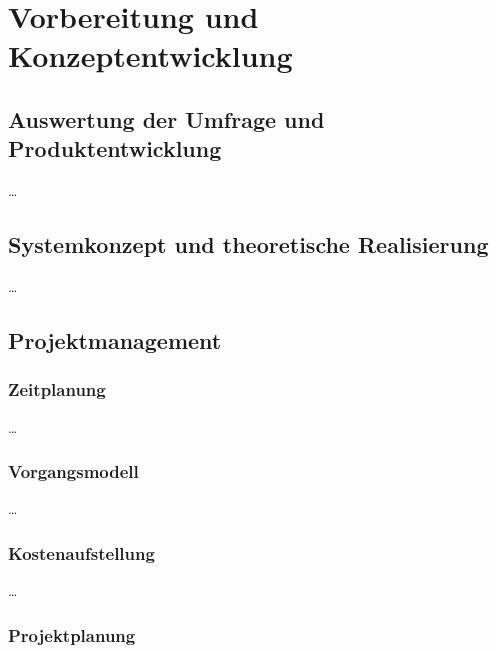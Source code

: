 
\chapter{Vorbereitung und Konzeptentwicklung} \label{Konzept}
\section{Auswertung der Umfrage und Produktentwicklung} \label{Auswertung der Umfrage und Produktentwicklung}

\ldots


\section{Systemkonzept und theoretische Realisierung} \label{Systemkonzept und theoretische Realisierung}

\ldots


\section{Projektmanagement} \label{Projektmanagement}
\subsection{Zeitplanung} \label{Zeitplanung}

\ldots

\subsection{Vorgangsmodell} \label{Vorgangsmodell}

\ldots

\subsection{Kostenaufstellung} \label{Kostenaufstellung}

\ldots

\subsection{Projektplanung} \label{Projektplanung}


